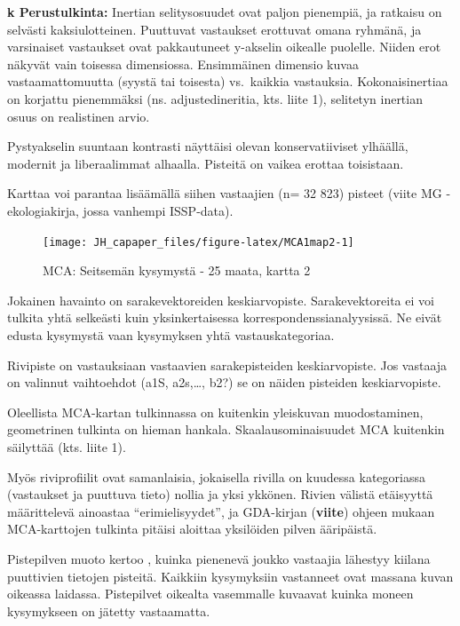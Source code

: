 \documentclass[
  finnish,
]{book}
\begin{document}
\textbf{k Perustulkinta:} Inertian selitysosuudet ovat paljon pienempiä, ja ratkaisu
on selvästi kaksiulotteinen. Puuttuvat vastaukset erottuvat omana ryhmänä, ja
varsinaiset vastaukset ovat pakkautuneet y-akselin oikealle puolelle. Niiden erot
näkyvät vain toisessa dimensiossa. Ensimmäinen dimensio kuvaa vastaamattomuutta
(syystä tai toisesta) vs.~kaikkia vastauksia. Kokonaisinertiaa on korjattu
pienemmäksi (ns. adjustedineritia, kts. liite 1),
selitetyn inertian osuus on realistinen arvio.

Pystyakselin suuntaan kontrasti näyttäisi olevan konservatiiviset ylhäällä,
modernit ja liberaalimmat alhaalla. Pisteitä on vaikea erottaa toisistaan.

Karttaa voi parantaa lisäämällä siihen vastaajien (n= 32 823) pisteet (viite MG - ekologiakirja, jossa vanhempi ISSP-data).

\begin{figure}

{\centering \texttt{[image: JH\_capaper\_files/figure-latex/MCA1map2-1]} 

}

\caption{MCA: Seitsemän kysymystä - 25 maata, kartta 2}\label{fig:MCA1map2}
\end{figure}

Jokainen havainto on sarakevektoreiden keskiarvopiste. Sarakevektoreita ei voi
tulkita yhtä selkeästi kuin yksinkertaisessa korrespondenssianalyysissä. Ne eivät
edusta kysymystä vaan kysymyksen yhtä vastauskategoriaa.

Rivipiste on vastauksiaan vastaavien sarakepisteiden keskiarvopiste. Jos vastaaja on valinnut
vaihtoehdot (a1S, a2s,\ldots, b2?) se on näiden pisteiden keskiarvopiste.

Oleellista MCA-kartan tulkinnassa on kuitenkin yleiskuvan muodostaminen, geometrinen
tulkinta on hieman hankala. Skaalausominaisuudet MCA kuitenkin säilyttää (kts. liite 1).

Myös riviprofiilit ovat samanlaisia, jokaisella rivilla on kuudessa kategoriassa (vastaukset
ja puuttuva tieto) nollia ja yksi ykkönen. Rivien välistä etäisyyttä määrittelevä ainoastaa
``erimielisyydet'', ja GDA-kirjan (\textbf{viite}) ohjeen mukaan MCA-karttojen tulkinta pitäisi aloittaa
yksilöiden pilven ääripäistä.

Pistepilven muoto kertoo , kuinka pienenevä joukko vastaajia lähestyy kiilana
puuttivien tietojen pisteitä. Kaikkiin kysymyksiin vastanneet ovat massana kuvan oikeassa laidassa. Pistepilvet
oikealta vasemmalle kuvaavat kuinka moneen kysymykseen on jätetty vastaamatta.
\end{document}
